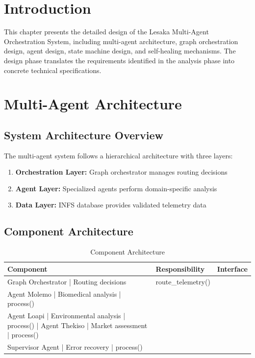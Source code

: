 
\section{Introduction}

This chapter presents the detailed design of the Lesaka Multi-Agent Orchestration System, including multi-agent architecture, graph orchestration design, agent design, state machine design, and self-healing mechanisms. The design phase translates the requirements identified in the analysis phase into concrete technical specifications.

\section{Multi-Agent Architecture}

\subsection{System Architecture Overview}

The multi-agent system follows a hierarchical architecture with three layers:

\begin{enumerate}
    \item \textbf{Orchestration Layer:} Graph orchestrator manages routing decisions
    \item \textbf{Agent Layer:} Specialized agents perform domain-specific analysis
    \item \textbf{Data Layer:} INFS database provides validated telemetry data
\end{enumerate}

\subsection{Component Architecture}

\begin{table}[H]
\centering
\begin{tabular}{|l|l|l|}
\hline
\textbf{Component} & \textbf{Responsibility} & \textbf{Interface} \\
\hline
Graph Orchestrator | Routing decisions & route\_telemetry() \\
Agent Molemo | Biomedical analysis | process() \\
Agent Loapi | Environmental analysis | process() |
Agent Thekiso | Market assessment | process() \\
Supervisor Agent | Error recovery | process() \\
\hline
\end{tabular}
\caption{Component Architecture}
\end{table}

